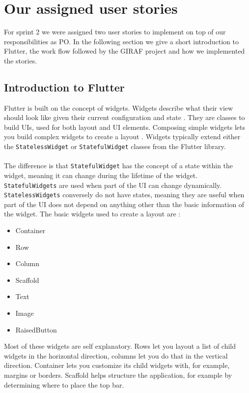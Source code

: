 \section{Our assigned user stories}\label{our-assigned-user-stories-sprint-2}
For sprint 2 we were assigned two user stories to implement on top of our responsibilities as PO.
In the following section we give a short introduction to Flutter, the work flow followed by the GIRAF project and how we implemented the stories.

\subsection{Introduction to Flutter}
Flutter is built on the concept of widgets.
Widgets describe what their view should look like given their current configuration and state \cite{Flutterwidget}. 
They are classes to build UIs, used for both layout and UI elements.
Composing simple widgets lets you build complex widgets to create a layout \cite{Flutterlayout}.
Widgets typically extend either the \texttt{StatelessWidget} or \texttt{StatefulWidget} classes from the Flutter library.
\\\\
The difference is that \texttt{StatefulWidget} has the concept of a state within the widget, meaning it can change during the lifetime of the widget.
\texttt{StatefulWidgets} are used when part of the UI can change dynamically.
\texttt{StatelessWidgets} conversely do not have states, meaning they are useful when part of the UI does not depend on anything other than the basic information of the widget. 
The basic widgets used to create a layout are \cite{FlutterBasicWidgets}:
 \begin{itemize}
    \item Container
    \item Row
    \item Column  
    \item Scaffold
    \item Text
    \item Image
    \item RaisedButton 
 \end{itemize} 
Most of these widgets are self explanatory. 
Rows let you layout a list of child widgets in the horizontal direction, columns let you do that in the vertical direction.
Container lets you customize its child widgets with, for example, margins or borders.
Scaffold helps structure the application, for example by determining where to place the top bar.

